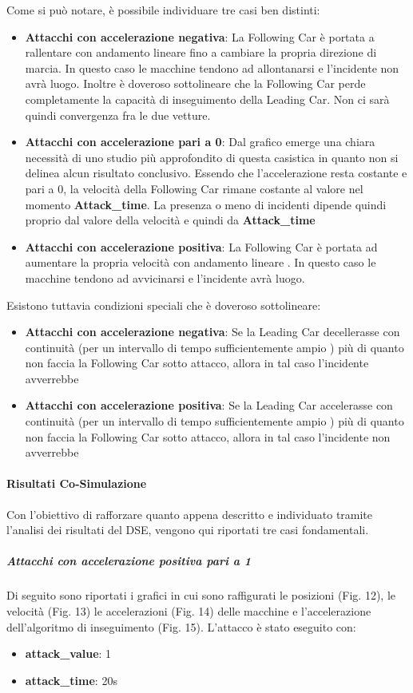Come si può notare, è possibile individuare tre casi ben distinti:
\begin{itemize}
	\item \textbf{Attacchi con accelerazione negativa}: La Following Car è portata a rallentare con andamento lineare fino a cambiare la propria direzione di marcia. In questo caso le macchine tendono ad allontanarsi e l'incidente non avrà luogo. Inoltre è doveroso sottolineare che la Following Car perde completamente la capacità di inseguimento della Leading Car. Non ci sarà quindi convergenza fra le due vetture.
	\item \textbf{Attacchi con accelerazione pari a 0}: Dal grafico emerge una chiara necessità di uno studio più approfondito di questa casistica in quanto non si delinea alcun risultato conclusivo. Essendo che l'accelerazione resta costante e pari a 0, la velocità della Following Car rimane costante al valore nel momento \textbf{Attack\_time}. La presenza o meno di incidenti dipende quindi proprio dal valore della velocità e quindi da \textbf{Attack\_time}
	\item \textbf{Attacchi con accelerazione positiva}: La Following Car è portata ad aumentare la propria velocità con andamento lineare . In questo caso le macchine tendono ad avvicinarsi e l'incidente avrà luogo.
\end{itemize}
Esistono tuttavia condizioni speciali che è doveroso sottolineare:
\begin{itemize}
	\item \textbf{Attacchi con accelerazione negativa}: Se la Leading Car decellerasse con continuità (per un intervallo di tempo sufficientemente ampio ) più di quanto non faccia la Following Car sotto attacco, allora in tal caso l'incidente avverrebbe
	\item \textbf{Attacchi con accelerazione positiva}: Se la Leading Car accelerasse con continuità (per un intervallo di tempo sufficientemente ampio ) più di quanto non faccia la Following Car sotto attacco, allora in tal caso l'incidente non avverrebbe
\end{itemize}
\paragraph{Risultati Co-Simulazione}
Con l'obiettivo di rafforzare quanto appena descritto  e individuato tramite l'analisi dei risultati del DSE, vengono qui riportati tre casi fondamentali.
\subparagraph{Attacchi con accelerazione positiva pari a 1} Di seguito sono riportati i grafici in cui sono raffigurati le posizioni (Fig. 12), le velocità (Fig. 13) le accelerazioni (Fig. 14) delle macchine e l'accelerazione dell'algoritmo di inseguimento (Fig. 15).
L'attacco è stato eseguito con:
\begin{itemize}
	\item \textbf{attack\_value}: 1
	\item \textbf{attack\_time}: 20s
\end{itemize}


